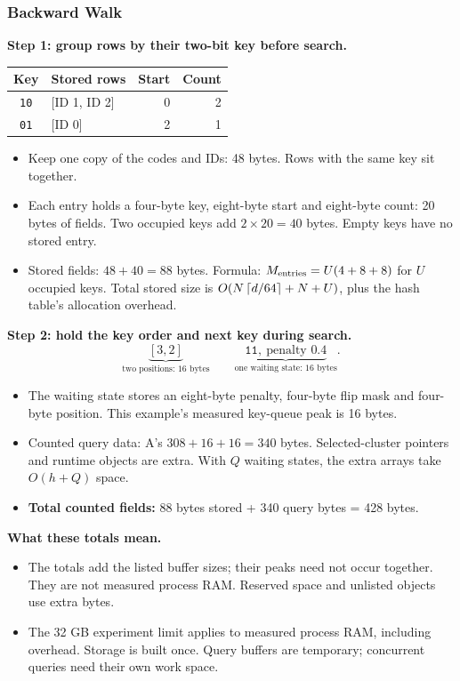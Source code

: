 \subsubsection{Backward Walk}
\textbf{Step 1: group rows by their two-bit key before search.}
\begin{center}
\begin{tabular}{@{}clrr@{}}\toprule
Key & Stored rows & Start & Count\\\midrule
\texttt{10} & [ID 1, ID 2] & 0 & 2\\
\texttt{01} & [ID 0] & 2 & 1\\\bottomrule
\end{tabular}
\end{center}
\begin{itemize}
\item Keep one copy of the codes and IDs: 48 bytes. Rows with the same key sit together.
\item Each entry holds a four-byte key, eight-byte start and eight-byte count: 20 bytes of fields.
Two occupied keys add $2\times20=40$ bytes. Empty keys have no stored entry.
\item Stored fields: $48+40=88$ bytes. Formula: $M_{\rm entries}=U(4+8+8)$ for $U$ occupied keys.
Total stored size is $O(N\left\lceil d/64\right\rceil+N+U)$, plus the hash table's allocation overhead.
\end{itemize}

\textbf{Step 2: hold the key order and next key during search.}
\[
 \underbrace{[3,2]}_{\text{two positions: 16 bytes}}
 \qquad
 \underbrace{\texttt{11},\ \text{penalty }0.4}_{\text{one waiting state: 16 bytes}}.
\]
\begin{itemize}
\item The waiting state stores an eight-byte penalty, four-byte flip mask and four-byte position.
This example's measured key-queue peak is 16 bytes.
\item Counted query data: A's $308+16+16=340$ bytes. Selected-cluster pointers and runtime objects
are extra. With $Q$ waiting states, the extra arrays take $O(h+Q)$ space.
\end{itemize}
\begin{itemize}
\item \textbf{Total counted fields:} 88 bytes stored + 340 query bytes = 428 bytes.
\end{itemize}

\textbf{What these totals mean.}
\begin{itemize}
\item The totals add the listed buffer sizes; their peaks need not occur together. They are not
measured process RAM. Reserved space and unlisted objects use extra bytes.
\item The 32 GB experiment limit applies to measured process RAM, including overhead. Storage is built once. Query buffers are temporary; concurrent queries need their own work space.
\end{itemize}

